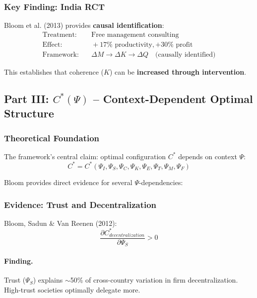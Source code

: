 \subsubsection{Key Finding: India RCT}

Bloom et al. (2013) provides \textbf{causal identification}:
\begin{align}
\text{Treatment:} & \quad \text{Free management consulting} \nonumber \\
\text{Effect:} & \quad +17\% \text{ productivity}, +30\% \text{ profit} \nonumber \\
\text{Framework:} & \quad \Delta M \to \Delta K \to \Delta Q \quad \text{(causally identified)}
\end{align}

This establishes that coherence ($K$) can be \textbf{increased through intervention}.

\subsection{Part III: $C^*(\Psi)$ – Context-Dependent Optimal Structure}

\subsubsection{Theoretical Foundation}

The framework's central claim: optimal configuration $C^*$ depends on context $\Psi$:
\begin{equation}
C^* = C^*(\Psi_I, \Psi_S, \Psi_C, \Psi_K, \Psi_E, \Psi_T, \Psi_M, \Psi_F)
\end{equation}

Bloom provides direct evidence for several $\Psi$-dependencies:

\subsubsection{Evidence: Trust and Decentralization}

Bloom, Sadun \& Van Reenen (2012):
\begin{equation}
\boxed{
\frac{\partial C^*_{decentralization}}{\partial \Psi_S} > 0
}
\label{eq:bloom-trust}
\end{equation}

\paragraph{Finding.}
Trust ($\Psi_S$) explains $\sim$50\% of cross-country variation in firm 
decentralization. High-trust societies optimally delegate more.


